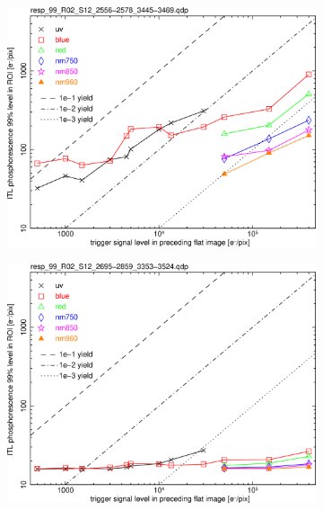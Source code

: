 \begin{figure}[!htbp]
\centering
\begin{subfigure}{0.45\textwidth}    
  \centering
  \includegraphics[width=\textwidth]{figures/phosphorescence-survey/phos_resp/resp_99_R02_S12_2556-2578_3445-3469.png}    
\end{subfigure}
\newline
\centering
\begin{subfigure}{0.45\textwidth}    
  \centering
  \includegraphics[width=\textwidth]{figures/phosphorescence-survey/phos_resp/resp_99_R02_S12_2695-2859_3353-3524.png}    
\end{subfigure}
\newline

\end{figure}
